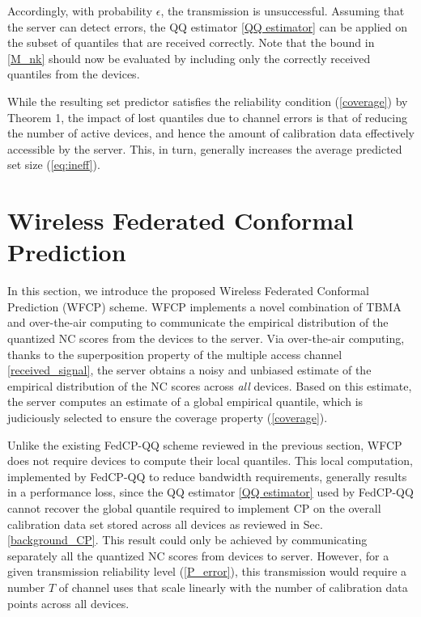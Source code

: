 \documentclass[12pt, draftclsnofoot, onecolumn]{IEEEtran}
\begin{document}
Accordingly, with probability $\epsilon$, the transmission is unsuccessful. Assuming that the server can detect errors, the QQ estimator \eqref{QQ estimator} can be applied on the subset of quantiles that are received correctly. Note that the bound in \eqref{M_nk} should now be evaluated by including only the correctly received quantiles from the devices.

While the resulting set predictor satisfies the reliability condition (\ref{coverage}) by Theorem 1, the impact of lost quantiles due to channel errors is that of reducing the number of active devices, and hence the amount of calibration data effectively accessible by the server. This, in turn, generally increases the average predicted set size (\ref{eq:ineff}).

\section{Wireless Federated Conformal Prediction} \label{WFCP}
In this section, we introduce the proposed Wireless Federated Conformal Prediction (WFCP) scheme. WFCP implements a novel combination of TBMA and over-the-air computing to communicate the empirical distribution of the quantized NC scores from the devices to the server. Via over-the-air computing, thanks to the superposition property of the multiple access channel \eqref{received_signal}, the server obtains a noisy and unbiased estimate of the empirical distribution of the NC scores across \emph{all} devices. Based on this estimate, the server computes an estimate of a global empirical quantile, which is judiciously selected to ensure the coverage property (\ref{coverage}).

Unlike the existing FedCP-QQ scheme reviewed in the previous section, WFCP does not require devices to compute their local quantiles. This local computation, implemented by FedCP-QQ to reduce bandwidth requirements, generally results in a performance loss, since the QQ estimator \eqref{QQ estimator} used by FedCP-QQ cannot recover the global quantile required to implement CP on the overall calibration data set stored across all devices as reviewed in Sec. \ref{background_CP}. This result could only be achieved by communicating separately all the quantized NC scores from devices to server. However, for a given transmission reliability level (\ref{P_error}), this transmission 
would require a number $T$ of channel uses that scale linearly with the number of calibration data points across all devices.
\end{document}
